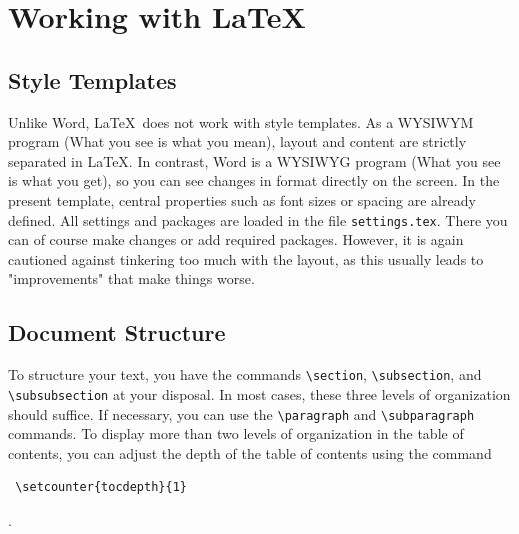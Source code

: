 
\chapter{Working with \LaTeX}

\section{Style Templates}
Unlike Word, \LaTeX\ does not work with style templates. As a WYSIWYM program (What you see is what you mean), layout and content are strictly separated in \LaTeX. In contrast, Word is a WYSIWYG program (What you see is what you get), so you can see changes in format directly on the screen.
In the present template, central properties such as font sizes or spacing are already defined. All settings and packages are loaded in the file \texttt{settings.tex}. There you can of course make changes or add required packages. However, it is again cautioned against tinkering too much with the layout, as this usually leads to "improvements" that make things worse.

\section{Document Structure}
To structure your text, you have the commands \verb|\section|, \verb|\subsection|, and \verb|\subsubsection| at your disposal. In most cases, these three levels of organization should suffice. If necessary, you can use the \verb|\paragraph| and \verb|\subparagraph| commands. To display more than two levels of organization in the table of contents, you can adjust the depth of the table of contents using the command \begin {verbatim} \setcounter{tocdepth}{1} \end{verbatim}.

